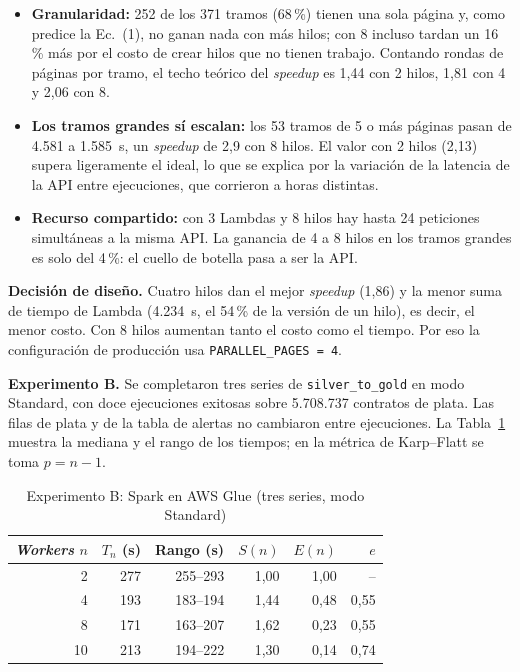 \documentclass[conference]{IEEEtran}
\begin{document}
\begin{itemize}
  \item \textbf{Granularidad:} 252 de los 371 tramos (68\,\%) tienen una sola página y, como predice la Ec.~(1), no ganan nada con más hilos; con 8 incluso tardan un 16\,\% más por el costo de crear hilos que no tienen trabajo. Contando rondas de páginas por tramo, el techo teórico del \textit{speedup} es 1,44 con 2 hilos, 1,81 con 4 y 2,06 con 8.
  \item \textbf{Los tramos grandes sí escalan:} los 53 tramos de 5 o más páginas pasan de 4.581 a 1.585~s, un \textit{speedup} de 2,9 con 8 hilos. El valor con 2 hilos (2,13) supera ligeramente el ideal, lo que se explica por la variación de la latencia de la API entre ejecuciones, que corrieron a horas distintas.
  \item \textbf{Recurso compartido:} con 3 Lambdas y 8 hilos hay hasta 24 peticiones simultáneas a la misma API. La ganancia de 4 a 8 hilos en los tramos grandes es solo del 4\,\%: el cuello de botella pasa a ser la API.
\end{itemize}

\textbf{Decisión de diseño.} Cuatro hilos dan el mejor \textit{speedup} (1,86) y la menor suma de tiempo de Lambda (4.234~s, el 54\,\% de la versión de un hilo), es decir, el menor costo. Con 8 hilos aumentan tanto el costo como el tiempo. Por eso la configuración de producción usa \texttt{PARALLEL\_PAGES = 4}.

\textbf{Experimento B.} Se completaron tres series de \texttt{silver\_to\_gold} en modo Standard, con doce ejecuciones exitosas sobre 5.708.737 contratos de plata. Las filas de plata y de la tabla de alertas no cambiaron entre ejecuciones. La Tabla~\ref{tab:spark} muestra la mediana y el rango de los tiempos; en la métrica de Karp--Flatt se toma $p = n-1$.

\begin{table}[htbp]
\caption{Experimento B: Spark en AWS Glue (tres series, modo Standard)}
\label{tab:spark}
\centering
\begin{tabular}{@{}rrrrrr@{}}
\toprule
\textit{Workers} $n$ & $T_n$ (s) & Rango (s) & $S(n)$ & $E(n)$ & $e$ \\
\midrule
2 & 277 & 255--293 & 1,00 & 1,00 & -- \\
4 & 193 & 183--194 & 1,44 & 0,48 & 0,55 \\
8 & 171 & 163--207 & 1,62 & 0,23 & 0,55 \\
10 & 213 & 194--222 & 1,30 & 0,14 & 0,74 \\
\bottomrule
\end{tabular}
\end{table}
\end{document}
